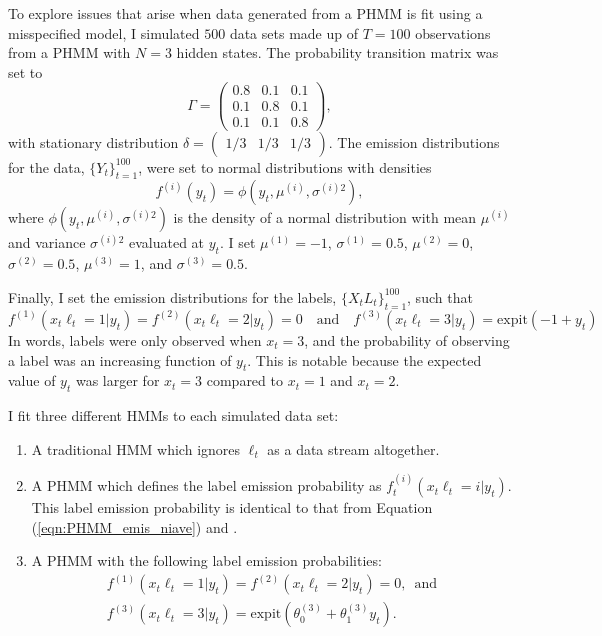 To explore issues that arise when data generated from a PHMM is fit using a misspecified model, I simulated $500$ data sets made up of $T = 100$ observations from a PHMM with $N = 3$ hidden states. The probability transition matrix was set to 
%
\begin{equation*}
   \Gamma = \begin{pmatrix} 
                0.8 & 0.1 & 0.1 \\
                0.1 & 0.8 & 0.1 \\
                0.1 & 0.1 & 0.8 
            \end{pmatrix}, 
\end{equation*}
%
with stationary distribution $\delta = \begin{pmatrix} 1/3 & 1/3 & 1/3 \end{pmatrix}$. 
%
The emission distributions for the data, $\{Y_t\}_{t=1}^{100}$, were set to normal distributions with densities
\begin{equation*}
    f^{(i)}(y_t) = \phi(y_t,\mu^{(i)},\sigma^{(i)2}),
\end{equation*}
where $\phi(y_t,\mu^{(i)},\sigma^{(i)2})$ is the density of a normal distribution with mean $\mu^{(i)}$ and variance $\sigma^{(i)2}$ evaluated at $y_t$. I set $\mu^{(1)} = -1$, $\sigma^{(1)} = 0.5$, $\mu^{(2)} = 0$, $\sigma^{(2)}=0.5$, $\mu^{(3)} = 1$, and $\sigma^{(3)} = 0.5$.

Finally, I set the emission distributions for the labels, $\{X_t L_t\}_{t=1}^{100}$, such that
\begin{equation*}
    f^{(1)}(x_t \ell_t = 1|y_t) = f^{(2)}(x_t \ell_t = 2|y_t) = 0 \quad \text{and} \quad f^{(3)}(x_t \ell_t = 3|y_t) = \text{expit}(-1+y_t)
\end{equation*}
In words, labels were only observed when $x_t = 3$, and the probability of observing a label was an increasing function of $y_t$. This is notable because the expected value of $y_t$ was larger for $x_t = 3$ compared to $x_t = 1$ and $x_t = 2$.

I fit three different HMMs to each simulated data set: 
%
\begin{enumerate}
    \item A traditional HMM which ignores $\ell_t$ as a data stream altogether.
    \item A PHMM which defines the label emission probability as $f_t^{(i)}(x_t \ell_t = i|y_t)$. This label emission probability is identical to that from Equation (\ref{eqn:PHMM_emis_niave}) and \cite{McClintock:2018}.
    \item A PHMM with the following label emission probabilities:
    \begin{gather}
        f^{(1)}(x_t \ell_t = 1|y_t) = f^{(2)}(x_t \ell_t = 2|y_t) = 0, \enspace \text{and} \nonumber \\
        f^{(3)}(x_t \ell_t = 3|y_t) = \text{expit}(\theta^{(3)}_0+\theta^{(3)}_1 y_t).
        \label{eqn:PHMM_emis_ss}
    \end{gather}
\end{enumerate}

